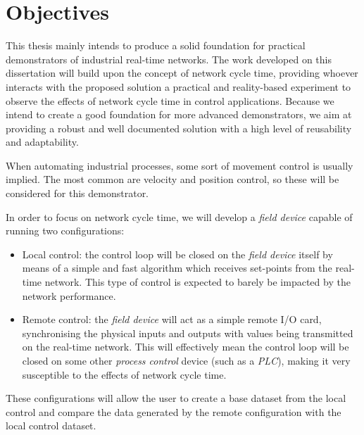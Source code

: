 \section{Objectives} \label{sec:objectives}

This thesis mainly intends to produce a solid foundation for practical demonstrators of industrial real-time networks. The work developed on this dissertation will build upon the concept of network cycle time, providing whoever interacts with the proposed solution a practical and reality-based experiment to observe the effects of network cycle time in control applications. Because we intend to create a good foundation for more advanced demonstrators, we aim at providing a robust and well documented solution with a high level of reusability and adaptability.

When automating industrial processes, some sort of movement control is usually implied. The most common are velocity and position control, so these will be considered for this demonstrator.

In order to focus on network cycle time, we will develop a \emph{field device} capable of running two configurations:

\begin{itemize}
	\item Local control: the control loop will be closed on the \emph{field device} itself by means of a simple and fast algorithm which receives set-points from the real-time network. This type of control is expected to barely be impacted by the network performance.

	\item Remote control: the \emph{field device} will act as a simple remote I/O card, synchronising the physical inputs and outputs with values being transmitted on the real-time network. This will effectively mean the control loop will be closed on some other \emph{process control} device (such as a \emph{PLC}), making it very susceptible to the effects of network cycle time.
\end{itemize}

These configurations will allow the user to create a base dataset from the local control and compare the data generated by the remote configuration with the local control dataset.
